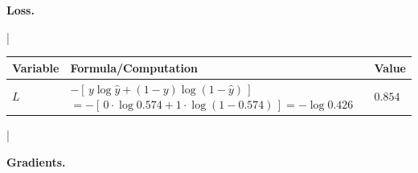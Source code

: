 \begin{answer}
  \textbf{Loss.}

  \medskip
  \begin{table}[H]
  \centering
  \lstDeleteShortInline|
  \begin{tabular}{|l|p{8.5cm}|l|}
  \hline
  Variable & Formula/Computation & Value \\
  \hline
  $L$ & $-[\,y\log \hat{y} + (1-y)\log(1-\hat{y})\,]$ \newline
    $= -[\,0 \cdot \log 0.574 + 1 \cdot \log(1 - 0.574)\,] = -\log 0.426$
    & $0.854$ \\
  \hline
  \end{tabular}
  \lstMakeShortInline|
  \end{table}

  \medskip
  \textbf{Gradients.} 


\end{answer}
